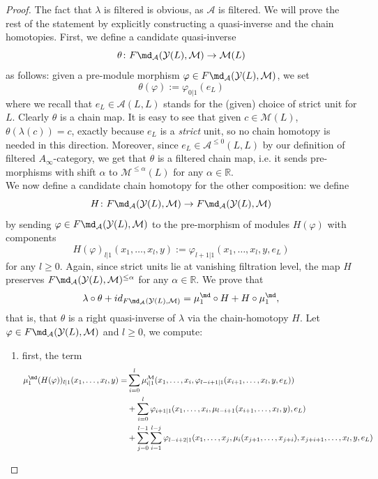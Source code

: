 \begin{proof}
	The fact that $\lambda$ is filtered is obvious, as $\mathcal{A}$ is filtered. We will prove the rest of the statement by explicitly constructing a quasi-inverse and the chain homotopies. First, we define a candidate quasi-inverse $$\theta\colon F\md_\mathcal{A}(\mathcal{Y}(L),\mathcal{M})\to \mathcal{M}(L)$$ as follows: given a pre-module morphism $\varphi\in F\md_\mathcal{A}(\mathcal{Y}(L),\mathcal{M}) $, we set $$\theta(\varphi):= \varphi_{0|1}(e_L)$$ where we recall that $e_L\in \mathcal{A}(L,L)$ stands for the (given) choice of strict unit for $L$. Clearly $\theta$ is a chain map. It is easy to see that given $c\in \mathcal{M}(L)$, $\theta(\lambda(c))=c$, exactly because $e_L$ is a \textit{strict} unit, so no chain homotopy is needed in this direction. Moreover, since $e_L\in \mathcal{A}^{\leq 0}(L,L)$ by our definition of filtered $A_\infty$-category, we get that $\theta$ is a filtered chain map, i.e. it sends pre-morphisms with shift $\alpha$ to $\mathcal{M}^{\leq \alpha}(L)$ for any $\alpha\in \mathbb R$.\\ We now define a candidate chain homotopy for the other composition: we define $$H\colon F\md_\mathcal{A}(\mathcal{Y}(L),\mathcal{M})\to F\md_\mathcal{A}(\mathcal{Y}(L),\mathcal{M})$$ by sending $\varphi \in F\md_\mathcal{A}(\mathcal{Y}(L),\mathcal{M})$ to the pre-morphism of modules $H(\varphi)$ with components $$H(\varphi)_{l|1}(x_1,\ldots, x_l,y):= \varphi_{l+1|1}(x_1,\ldots, x_l,y,e_L)$$ for any $l\geq 0$. Again, since strict units lie at vanishing filtration level, the map $H$ preserves $F\md_\mathcal{A}(\mathcal{Y}(L),\mathcal{M})^{\leq \alpha}$ for any $\alpha\in \mathbb R$. We prove that $$\lambda\circ \theta + id_{F\md_\mathcal{A}(\mathcal{Y}(L),\mathcal{M})} = \mu_1^{\md}\circ H + H \circ \mu_1^{\md},$$ that is, that $\theta$ is a right quasi-inverse of $\lambda$ via the chain-homotopy $H$. Let $\varphi\in F\md_\mathcal{A}(\mathcal{Y}(L),\mathcal{M})$ and $l\geq 0$, we compute:
	\begin{enumerate}
		\item first, the term \begin{align*}
			\mu_1^{\md}(H(\varphi))_{l|1}(x_1,\ldots, x_l,y)  =&  \sum_{i=0}^l \mu^\mathcal{M}_{i|1}(x_1,\ldots, x_i, \varphi_{l-i+1|1}(x_{i+1},\ldots, x_l,y,e_L)) \\ & + \sum_{i=0}^l \varphi_{i+1|1}(x_1,\ldots, x_i, \mu_{l-i+1}(x_{i+1},\ldots, x_l,y),e_L) \\
			& + \sum_{j=0}^{l-1}\sum_{i=1}^{l-j} \varphi_{l-i+2|1}(x_1,\ldots, x_j, \mu_{i}(x_{j+1},\ldots, x_{j+i}),x_{j+i+1},\ldots, x_l,y,e_L)

\end{align*}
\end{enumerate}
\end{proof}
